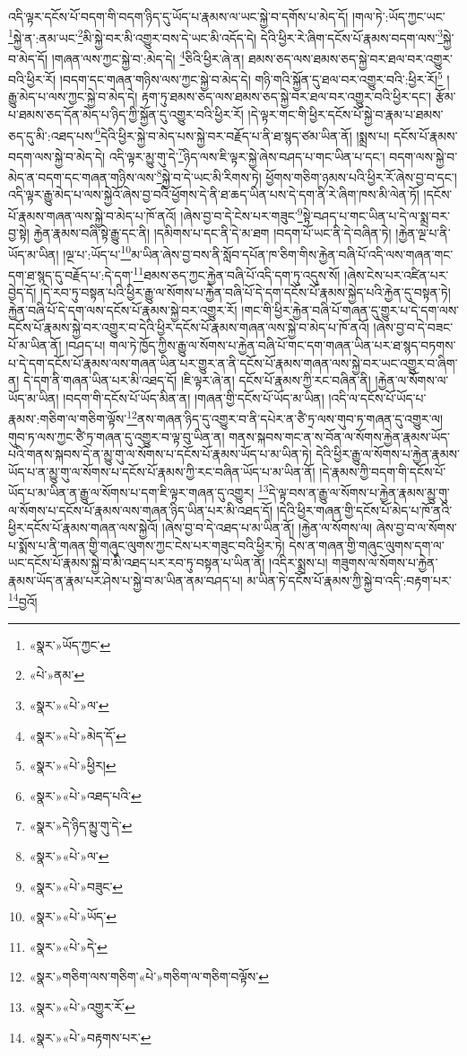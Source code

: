 འདི་ལྟར་དངོས་པོ་བདག་གི་བདག་ཉིད་དུ་ཡོད་པ་རྣམས་ལ་ཡང་སྐྱེ་བ་དགོས་པ་མེད་དོ། །གལ་ཏེ་:ཡོད་ཀྱང་ཡང་\footnote{«སྣར་»ཡོད་ཀྱང་}སྐྱེ་ན་:ནམ་ཡང་\footnote{«པེ་»ནམ་}མི་སྐྱེ་བར་མི་འགྱུར་བས་དེ་ཡང་མི་འདོད་དེ། དེའི་ཕྱིར་རེ་ཞིག་དངོས་པོ་རྣམས་བདག་ལས་\footnote{«སྣར་»«པེ་»ལ་}སྐྱེ་བ་མེད་དོ། །གཞན་ལས་ཀྱང་སྐྱེ་བ་:མེད་དེ། \footnote{«སྣར་»«པེ་»མེད་དོ་}ཅིའི་ཕྱིར་ཞེ་ན། ཐམས་ཅད་ལས་ཐམས་ཅད་སྐྱེ་བར་ཐལ་བར་འགྱུར་བའི་ཕྱིར་རོ། །བདག་དང་གཞན་གཉིས་ལས་ཀྱང་སྐྱེ་བ་མེད་དེ། གཉི་གའི་སྐྱོན་དུ་ཐལ་བར་འགྱུར་བའི་:ཕྱིར་རོ།\footnote{«སྣར་»«པེ་»ཕྱིར།} །རྒྱུ་མེད་པ་ལས་ཀྱང་སྐྱེ་བ་མེད་དེ། རྟག་ཏུ་ཐམས་ཅད་ལས་ཐམས་ཅད་སྐྱེ་བར་ཐལ་བར་འགྱུར་བའི་ཕྱིར་དང་། རྩོམ་པ་ཐམས་ཅད་དོན་མེད་པ་ཉིད་ཀྱི་སྐྱོན་དུ་འགྱུར་བའི་ཕྱིར་རོ། །དེ་ལྟར་གང་གི་ཕྱིར་དངོས་པོ་སྐྱེ་བ་རྣམ་པ་ཐམས་ཅད་དུ་མི་:འཐད་པས་\footnote{«སྣར་»«པེ་»འཐད་པའི་}དེའི་ཕྱིར་སྐྱེ་བ་མེད་པས་སྐྱེ་བར་བརྗོད་པ་ནི་ཐ་སྙད་ཙམ་ཡིན་ནོ། །སྨྲས་པ། དངོས་པོ་རྣམས་བདག་ལས་སྐྱེ་བ་མེད་དེ། འདི་ལྟར་མྱུ་གུ་དེ་\footnote{«སྣར་»དེ་ཉིད་མྱུ་གུ་དེ་}ཉིད་ལས་ཇི་ལྟར་སྐྱེ་ཞེས་བཤད་པ་གང་ཡིན་པ་དང་། བདག་ལས་སྐྱེ་བ་མེད་ན་བདག་དང་གཞན་གཉིས་ལས་\footnote{«སྣར་»«པེ་»ལ་}སྐྱེ་བ་དེ་ཡང་མི་རིགས་ཏེ། ཕྱོགས་གཅིག་ཉམས་པའི་ཕྱིར་རོ་ཞེས་བྱ་བ་དང་། འདི་ལྟར་རྒྱུ་མེད་པ་ལས་སྐྱེའོ་ཞེས་བྱ་བའི་ཕྱོགས་དེ་ནི་ཐ་ཆད་ཡིན་པས་དེ་དག་ནི་རེ་ཞིག་ཁས་མི་ལེན་ཏོ། །དངོས་པོ་རྣམས་གཞན་ལས་སྐྱེ་བ་མེད་པ་ཁོ་ནའོ། །ཞེས་བྱ་བ་དེ་ངེས་པར་གཟུང་\footnote{«སྣར་»«པེ་»བཟུང་}སྟེ་བཤད་པ་གང་ཡིན་པ་དེ་ལ་སྨྲ་བར་བྱ་སྟེ། རྐྱེན་རྣམས་བཞི་སྟེ་རྒྱུ་དང་ནི། །དམིགས་པ་དང་ནི་དེ་མ་ཐག །བདག་པོ་ཡང་ནི་དེ་བཞིན་ཏེ། །རྐྱེན་ལྔ་པ་ནི་ཡོད་མ་ཡིན། །ལྔ་པ་:ཡོད་པ་\footnote{«སྣར་»«པེ་»ཡོད་}མ་ཡིན་ཞེས་བྱ་བས་ནི་སློབ་དཔོན་ཁ་ཅིག་གིས་རྐྱེན་བཞི་པོ་འདི་ལས་གཞན་གང་དག་ཐ་སྙད་དུ་བརྗོད་པ་:དེ་དག་\footnote{«སྣར་»«པེ་»དེ་}ཐམས་ཅད་ཀྱང་རྐྱེན་བཞི་པོ་འདི་དག་ཏུ་འདུས་སོ། །ཞེས་ངེས་པར་འཛིན་པར་བྱེད་དོ། །དེ་རབ་ཏུ་བསྟན་པའི་ཕྱིར་རྒྱུ་ལ་སོགས་པ་རྐྱེན་བཞི་པོ་དེ་དག་དངོས་པོ་རྣམས་སྐྱེད་པའི་རྐྱེན་དུ་བསྟན་ཏེ། རྐྱེན་བཞི་པོ་དེ་དག་ལས་དངོས་པོ་རྣམས་སྐྱེ་བར་འགྱུར་རོ། །གང་གི་ཕྱིར་རྐྱེན་བཞི་པོ་གཞན་དུ་གྱུར་པ་དེ་དག་ལས་དངོས་པོ་རྣམས་སྐྱེ་བར་འགྱུར་བ་དེའི་ཕྱིར་དངོས་པོ་རྣམས་གཞན་ལས་སྐྱེ་བ་མེད་པ་ཁོ་ནའོ། །ཞེས་བྱ་བ་དེ་བཟང་པོ་མ་ཡིན་ནོ། །བཤད་པ། གལ་ཏེ་ཁྱོད་ཀྱིས་རྒྱུ་ལ་སོགས་པ་རྐྱེན་བཞི་པོ་གང་དག་གཞན་ཡིན་པར་ཐ་སྙད་བཏགས་པ་དེ་དག་དངོས་པོ་རྣམས་ལས་གཞན་ཡིན་པར་གྱུར་ན་ནི་དངོས་པོ་རྣམས་གཞན་ལས་སྐྱེ་བར་ཡང་འགྱུར་བ་ཞིག་ན། དེ་དག་ནི་གཞན་ཡིན་པར་མི་འཐད་དོ། །ཇི་ལྟར་ཞེ་ན། དངོས་པོ་རྣམས་ཀྱི་རང་བཞིན་ནི། །རྐྱེན་ལ་སོགས་ལ་ཡོད་མ་ཡིན། །བདག་གི་དངོས་པོ་ཡོད་མིན་ན། །གཞན་གྱི་དངོས་པོ་ཡོད་མ་ཡིན། །འདི་ལ་དངོས་པོ་ཡོད་པ་རྣམས་:གཅིག་ལ་གཅིག་ལྟོས་\footnote{«སྣར་»གཅིག་ལས་གཅིག་«པེ་»གཅིག་ལ་གཅིག་བལྟོས་}ནས་གཞན་ཉིད་དུ་འགྱུར་བ་ནི་དཔེར་ན་ཙཻ་ཏྲ་ལས་གུབ་ཏ་གཞན་དུ་འགྱུར་ལ། གུབ་ཏ་ལས་ཀྱང་ཙཻ་ཏྲ་གཞན་དུ་འགྱུར་བ་ལྟ་བུ་ཡིན་ན། གནས་སྐབས་གང་ན་ས་བོན་ལ་སོགས་རྐྱེན་རྣམས་ཡོད་པའི་གནས་སྐབས་དེ་ན་མྱུ་གུ་ལ་སོགས་པ་དངོས་པོ་རྣམས་ཡོད་པ་མ་ཡིན་ཏེ། དེའི་ཕྱིར་རྒྱུ་ལ་སོགས་པ་རྐྱེན་རྣམས་ཡོད་པ་ན་མྱུ་གུ་ལ་སོགས་པ་དངོས་པོ་རྣམས་ཀྱི་རང་བཞིན་ཡོད་པ་མ་ཡིན་ནོ། །དེ་རྣམས་ཀྱི་བདག་གི་དངོས་པོ་ཡོད་པ་མ་ཡིན་ན་རྒྱུ་ལ་སོགས་པ་དག་ཇི་ལྟར་གཞན་དུ་འགྱུར། \footnote{«སྣར་»«པེ་»འགྱུར་རོ་}དེ་ལྟ་བས་ན་རྒྱུ་ལ་སོགས་པ་རྐྱེན་རྣམས་མྱུ་གུ་ལ་སོགས་པ་དངོས་པོ་རྣམས་ལས་གཞན་ཉིད་ཡིན་པར་མི་འཐད་དོ། །དེའི་ཕྱིར་གཞན་གྱི་དངོས་པོ་མེད་པ་ཁོ་ནའི་ཕྱིར་དངོས་པོ་རྣམས་གཞན་ལས་སྐྱེའོ། །ཞེས་བྱ་བ་དེ་འཐད་པ་མ་ཡིན་ནོ། །རྐྱེན་ལ་སོགས་ལ། ཞེས་བྱ་བ་ལ་སོགས་པ་སྨོས་པ་ནི་གཞན་གྱི་གཞུང་ལུགས་ཀྱང་ངེས་པར་གཟུང་བའི་ཕྱིར་ཏེ། དེས་ན་གཞན་གྱི་གཞུང་ལུགས་དག་ལ་ཡང་དངོས་པོ་རྣམས་སྐྱེ་བ་མི་འཐད་པར་རབ་ཏུ་བསྟན་པ་ཡིན་ནོ། །འདིར་སྨྲས་པ། གཟུགས་ལ་སོགས་པ་རྐྱེན་རྣམས་ཡོད་ན་རྣམ་པར་ཤེས་པ་སྐྱེ་བ་མ་ཡིན་ནམ་བཤད་པ། མ་ཡིན་ཏེ་དངོས་པོ་རྣམས་ཀྱི་སྐྱེ་བ་འདི་:བརྟག་པར་\footnote{«སྣར་»«པེ་»བརྟགས་པར་}བྱའོ། 